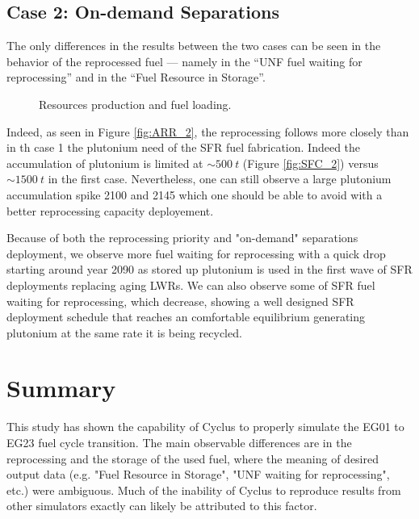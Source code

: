 \documentclass[12pt]{article}
\begin{document}
\subsection{Case 2: On-demand Separations}

The only differences in the results between the two cases can be seen in the
behavior of the reprocessed fuel --- namely in the ``UNF fuel waiting for
reprocessing'' and in the ``Fuel Resource in Storage''.

\begin{figure}[h!]
    \centering
    \caption{Resources production and fuel loading.\label{fig:ARR_FWR_SFC_2} }
\end{figure}

Indeed, as seen in Figure \ref{fig:ARR_2}, the reprocessing follows more closely
than in th case 1 the plutonium need of the SFR fuel fabrication. Indeed the
accumulation of plutonium is limited at $\sim500~t$ (Figure \ref{fig:SFC_2}) versus $\sim1500~t$ in the
first case. Nevertheless, one can still observe a large plutonium accumulation
spike 2100 and 2145 which one should be able to avoid with a better reprocessing
capacity deployement.

Because of both the reprocessing priority and "on-demand" separations
deployment, we observe more fuel waiting for reprocessing with a quick drop
starting around year 2090 as stored up plutonium is used in the first wave of
SFR deployments replacing aging LWRs. We can also observe some of SFR fuel
waiting for reprocessing, which decrease, showing a well designed SFR
deployment schedule that reaches an comfortable equilibrium generating
plutonium at the same rate it is being recycled.

\section{Summary}

This study has shown the capability of Cyclus to properly simulate the EG01 to
EG23 fuel cycle transition.  The main observable differences are in the
reprocessing and the storage of the used fuel, where the meaning of desired
output data (e.g. "Fuel Resource in Storage", "UNF waiting for reprocessing",
etc.) were ambiguous.  Much of the inability of Cyclus to reproduce results
from other simulators exactly can likely be attributed to this factor.
\end{document}
